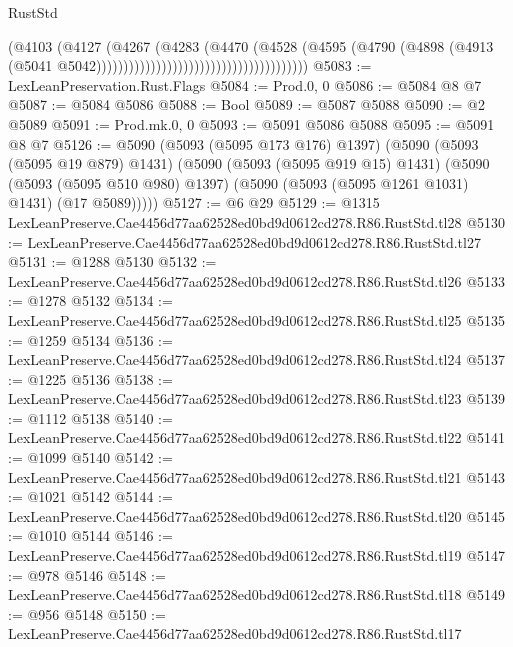 \begin{lexlean}{RustStd}
\begin{coremodule}
                                                            (@4103
                                                              (@4127
                                                                (@4267
                                                                  (@4283
                                                                    (@4470
                                                                      (@4528
                                                                        (@4595
                                                                          (@4790
                                                                            (@4898
                                                                              (@4913
                                                                                (@5041
                                                                                  @5042)))))))))))))))))))))))))))))))))))))))
@5083 := LexLeanPreservation.Rust.Flags
@5084 := Prod.{0, 0}
@5086 := @5084 @8 @7
@5087 := @5084 @5086
@5088 := Bool
@5089 := @5087 @5088
@5090 := @2 @5089
@5091 := Prod.mk.{0, 0}
@5093 := @5091 @5086 @5088
@5095 := @5091 @8 @7
@5126 := @5090
    (@5093 (@5095 @173 @176) @1397)
    (@5090
      (@5093 (@5095 @19 @879) @1431)
      (@5090
        (@5093 (@5095 @919 @15) @1431)
        (@5090
          (@5093 (@5095 @510 @980) @1397)
          (@5090 (@5093 (@5095 @1261 @1031) @1431) (@17 @5089)))))
@5127 := @6 @29
@5129 := @1315 LexLeanPreserve.Cae4456d77aa62528ed0bd9d0612cd278.R86.RustStd.tl28
@5130 := LexLeanPreserve.Cae4456d77aa62528ed0bd9d0612cd278.R86.RustStd.tl27
@5131 := @1288 @5130
@5132 := LexLeanPreserve.Cae4456d77aa62528ed0bd9d0612cd278.R86.RustStd.tl26
@5133 := @1278 @5132
@5134 := LexLeanPreserve.Cae4456d77aa62528ed0bd9d0612cd278.R86.RustStd.tl25
@5135 := @1259 @5134
@5136 := LexLeanPreserve.Cae4456d77aa62528ed0bd9d0612cd278.R86.RustStd.tl24
@5137 := @1225 @5136
@5138 := LexLeanPreserve.Cae4456d77aa62528ed0bd9d0612cd278.R86.RustStd.tl23
@5139 := @1112 @5138
@5140 := LexLeanPreserve.Cae4456d77aa62528ed0bd9d0612cd278.R86.RustStd.tl22
@5141 := @1099 @5140
@5142 := LexLeanPreserve.Cae4456d77aa62528ed0bd9d0612cd278.R86.RustStd.tl21
@5143 := @1021 @5142
@5144 := LexLeanPreserve.Cae4456d77aa62528ed0bd9d0612cd278.R86.RustStd.tl20
@5145 := @1010 @5144
@5146 := LexLeanPreserve.Cae4456d77aa62528ed0bd9d0612cd278.R86.RustStd.tl19
@5147 := @978 @5146
@5148 := LexLeanPreserve.Cae4456d77aa62528ed0bd9d0612cd278.R86.RustStd.tl18
@5149 := @956 @5148
@5150 := LexLeanPreserve.Cae4456d77aa62528ed0bd9d0612cd278.R86.RustStd.tl17

\end{coremodule}
\end{lexlean}
